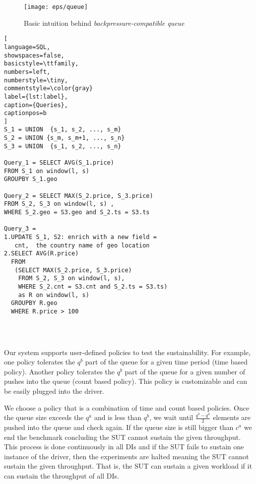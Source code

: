 
\begin{figure}[h]
\centering
\texttt{[image: eps/queue]}
\caption{Basic intuition behind \textit{backpressure-compatible queue}}
\label{fig_queue}
\end{figure}


\begin{lstlisting}[
language=SQL,
showspaces=false,
basicstyle=\ttfamily,
numbers=left,
numberstyle=\tiny,
commentstyle=\color{gray}
label={lst:label},
caption={Queries},
captionpos=b
]
S_1 = UNION  {s_1, s_2, ..., s_m}
S_2 = UNION {s_m, s_m+1, ..., s_n}
S_3 = UNION  {s_1, s_2, ..., s_n}

Query_1 = SELECT AVG(S_1.price)
FROM S_1 on window(l, s) 
GROUPBY S_1.geo

Query_2 = SELECT MAX(S_2.price, S_3.price)
FROM S_2, S_3 on window(l, s) , 
WHERE S_2.geo = S3.geo and S_2.ts = S3.ts

Query_3 = 
1.UPDATE S_1, S2: enrich with a new field = 
   cnt,  the country name of geo location
2.SELECT AVG(R.price)
  FROM  
   (SELECT MAX(S_2.price, S_3.price)
    FROM S_2, S_3 on window(l, s), 
    WHERE S_2.cnt = S3.cnt and S_2.ts = S3.ts)  
    as R on window(l, s)  
  GROUPBY R.geo
  WHERE R.price > 100




\end{lstlisting}

Our system supports user-defined policies to test the sustainability. For example, one policy tolerates the $q^{b}$ part of the queue for a given time period (time based policy). Another policy tolerates   the $q^{b}$ part of the queue for a given number of pushes into the queue (count based policy).%
This policy is customizable and can be easily plugged into the driver. %



We choose a policy that is a combination of time and count based policies. Once the queue size exceeds the $q^{a}$ and is less than $q^{b}$, we wait until $\frac{q^{b} - q^{a}}{2}  $ elements are pushed into the queue and check again. If the queue size is still bigger than $c^{a}$ we end the benchmark concluding the SUT cannot sustain the given throughput. %
This process is done continuously in all DIs %
and if the SUT fails to sustain one instance of the driver, then the experiments are halted meaning the SUT cannot sustain the given throughput. That is, the SUT can sustain a given workload if it can sustain the throughput of all DIs.%

